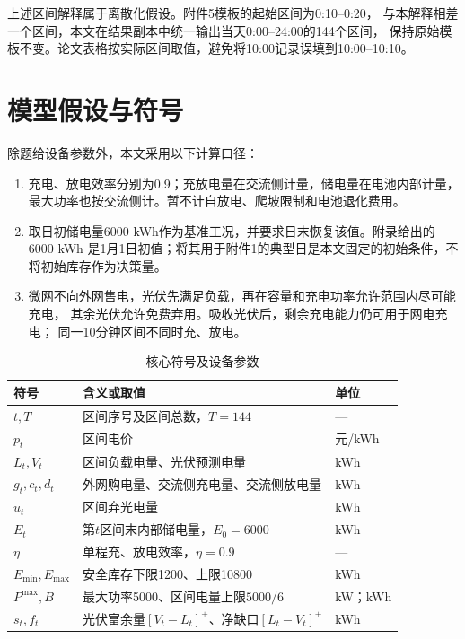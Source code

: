 \documentclass[UTF8,a4paper,12pt,fontset=fandol]{ctexart}
\newcommand{\pos}[1]{\left[#1\right]^+}
\begin{document}
上述区间解释属于离散化假设。附件5模板的起始区间为0:10--0:20，
与本解释相差一个区间，本文在结果副本中统一输出当天0:00--24:00的144个区间，
保持原始模板不变。论文表格按实际区间取值，避免将10:00记录误填到10:00--10:10。

\section{模型假设与符号}
除题给设备参数外，本文采用以下计算口径：
\begin{enumerate}[label=(\arabic*),leftmargin=2.8em,itemsep=0.2em]
  \item 充电、放电效率分别为0.9；充放电量在交流侧计量，储电量在电池内部计量，
  最大功率也按交流侧计。暂不计自放电、爬坡限制和电池退化费用。
  \item 取日初储电量6000 kWh作为基准工况，并要求日末恢复该值。附录给出的6000 kWh
  是1月1日初值；将其用于附件1的典型日是本文固定的初始条件，不将初始库存作为决策量。
  \item 微网不向外网售电，光伏先满足负载，再在容量和充电功率允许范围内尽可能充电，
  其余光伏允许免费弃用。吸收光伏后，剩余充电能力仍可用于网电充电；
  同一10分钟区间不同时充、放电。
\end{enumerate}

\begin{table}[htbp]
  \centering\small
  \caption{核心符号及设备参数}\label{tab:symbols}
  \begin{tabularx}{\linewidth}{lXl}
    \toprule
    符号 & 含义或取值 & 单位\\
    \midrule
    $t,T$ & 区间序号及区间总数，$T=144$ & ---\\
    $p_t$ & 区间电价 & 元/kWh\\
    $L_t,V_t$ & 区间负载电量、光伏预测电量 & kWh\\
    $g_t,c_t,d_t$ & 外网购电量、交流侧充电量、交流侧放电量 & kWh\\
    $u_t$ & 区间弃光电量 & kWh\\
    $E_t$ & 第$t$区间末内部储电量，$E_0=6000$ & kWh\\
    $\eta$ & 单程充、放电效率，$\eta=0.9$ & ---\\
    $E_{\min},E_{\max}$ & 安全库存下限1200、上限10800 & kWh\\
    $P^{\max},B$ & 最大功率5000、区间电量上限$5000/6$ & kW；kWh\\
    $s_t,f_t$ & 光伏富余量$\pos{V_t-L_t}$、净缺口$\pos{L_t-V_t}$ & kWh\\
    \bottomrule
  \end{tabularx}
\end{table}
\end{document}
